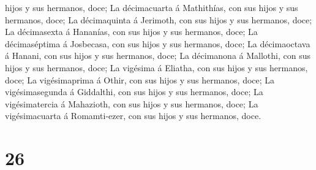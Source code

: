 hijos y sus hermanos, doce;  La décimacuarta á Mathithías,
con sus hijos y sus hermanos, doce;  La décimaquinta á
Jerimoth, con sus hijos y sus hermanos, doce;  La
décimasexta á Hananías, con sus hijos y sus hermanos, doce;
 La décimaséptima á Josbecasa, con sus hijos y sus
hermanos, doce;  La décimaoctava á Hanani, con sus hijos y
sus hermanos, doce;  La décimanona á Mallothi, con sus
hijos y sus hermanos, doce;  La vigésima á Eliatha, con sus
hijos y sus hermanos, doce;  La vigésimaprima á Othir, con
sus hijos y sus hermanos, doce;  La vigésimasegunda á
Giddalthi, con sus hijos y sus hermanos, doce;  La
vigésimatercia á Mahazioth, con sus hijos y sus hermanos, doce;
 La vigésimacuarta á Romamti-ezer, con sus hijos y sus
hermanos, doce.

\hypertarget{section-25}{%
\section{26}\label{section-25}}


